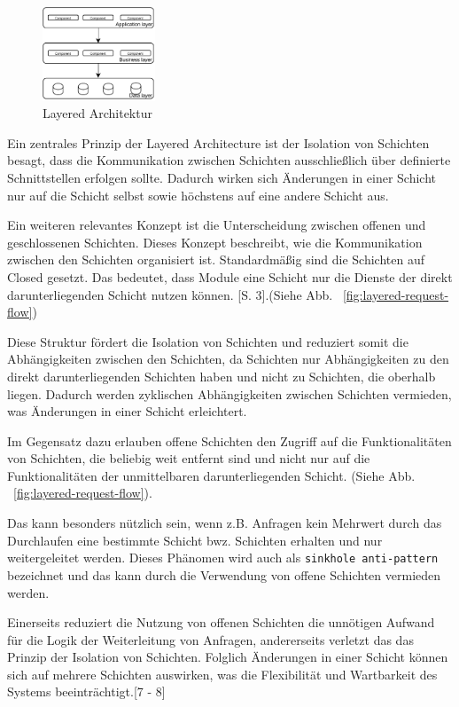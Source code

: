 \documentclass[acmtog]{acmart}
\begin{document}
\begin{figure}[h!]
    \centering
    \includegraphics[width=0.3\textwidth]{images/layer.pdf}
    \caption{Layered Architektur}
    \label{fig:layered}
\end{figure}

Ein zentrales Prinzip der Layered Architecture ist der Isolation von Schichten besagt, dass die Kommunikation
zwischen Schichten ausschließlich über definierte Schnittstellen erfolgen sollte.
Dadurch wirken sich Änderungen in einer Schicht nur auf die Schicht selbst sowie höchstens auf eine andere Schicht aus. \cite[10]{layered}

Ein weiteren relevantes Konzept ist die Unterscheidung zwischen offenen und geschlossenen Schichten.
Dieses Konzept beschreibt, wie die Kommunikation zwischen den Schichten organisiert ist.
Standardmäßig sind die Schichten auf Closed gesetzt.
Das bedeutet, dass Module eine Schicht nur die Dienste der direkt darunterliegenden Schicht nutzen können.
\cite{layered}[S. 3].(Siehe Abb. ~\ref{fig:layered-request-flow})

Diese Struktur fördert die Isolation von Schichten und reduziert somit die Abhängigkeiten zwischen den Schichten, da
 Schichten nur Abhängigkeiten zu den direkt darunterliegenden Schichten haben und nicht zu Schichten, die oberhalb liegen.
Dadurch werden zyklischen Abhängigkeiten zwischen Schichten vermieden, was Änderungen in einer Schicht erleichtert.

Im Gegensatz dazu erlauben offene Schichten den Zugriff auf die Funktionalitäten von Schichten, die beliebig
weit entfernt sind und nicht nur auf die Funktionalitäten der unmittelbaren darunterliegenden Schicht.
(Siehe Abb. ~\ref{fig:layered-request-flow}). \cite[4]{layered}

Das kann besonders nützlich sein, wenn z.B. Anfragen kein Mehrwert durch das
Durchlaufen eine bestimmte Schicht bwz. Schichten erhalten und nur weitergeleitet werden.
Dieses Phänomen wird auch als \texttt{sinkhole anti-pattern} bezeichnet und das kann durch die
Verwendung von offene Schichten vermieden werden.

Einerseits reduziert die Nutzung von offenen Schichten die unnötigen Aufwand für die Logik der Weiterleitung von Anfragen,
 andererseits verletzt das das Prinzip der Isolation von Schichten.
Folglich Änderungen in einer Schicht können sich auf mehrere Schichten auswirken, was die Flexibilität und Wartbarkeit
des Systems beeinträchtigt.[7 - 8]\cite{layered}
\end{document}

